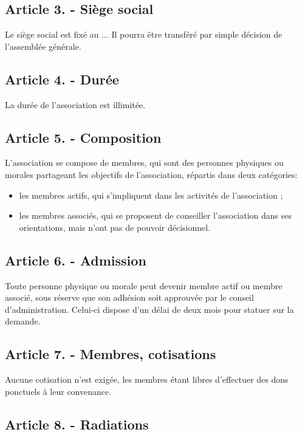 \documentclass[a4paper]{article}
\begin{document}
\subsection*{Article 3. - Siège social}

Le siège social est fixé au ...
Il pourra être transféré par simple décision de l'assemblée générale.

\subsection*{Article 4. - Durée}

La durée de l'association est illimitée.

\subsection*{Article 5. - Composition}

L'association se compose de membres, qui sont des personnes physiques ou morales partageant les objectifs de l'association, répartis dans deux catégories:
\begin{itemize}
  \item les membres actifs, qui s'impliquent dans les activités de l'association ;
  \item les membres associés, qui se proposent de conseiller l'association dans ses orientations, mais n'ont pas de pouvoir décisionnel.
\end{itemize}

\subsection*{Article 6. - Admission}

Toute personne physique ou morale peut devenir membre actif ou membre associé, sous réserve que son adhésion soit approuvée
par le conseil d'administration. Celui-ci dispose d'un délai de deux mois pour statuer sur la demande.

\subsection*{Article 7. - Membres, cotisations}

Aucune cotisation n'est exigée, les membres étant libres d'effectuer des dons ponctuels à leur convenance.

\subsection*{Article 8. - Radiations}
\end{document}
